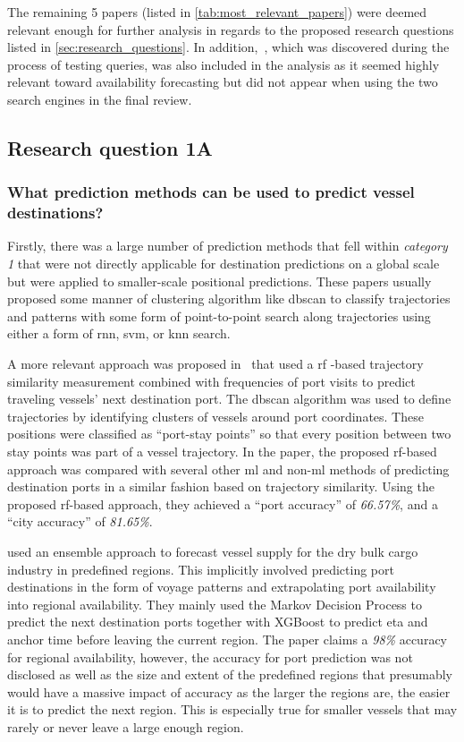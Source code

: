 The remaining \textbf{}5 papers (listed in \cref{tab:most_relevant_papers}) were deemed relevant enough for further analysis in regards to the proposed research questions listed in \cref{sec:research_questions}. In addition,~\cite{lechtenberg2019}, which was discovered during the process of testing queries, was also included in the analysis as it seemed highly relevant toward availability forecasting but did not appear when using the two search engines in the final review.

\subsection{Research question 1A}
\subsubsection{What prediction methods can be used to predict vessel destinations?}

Firstly, there was a large number of prediction methods that fell within \textit{category 1} that were not directly applicable for destination predictions on a global scale but were applied to smaller-scale positional predictions. These papers usually proposed some manner of clustering algorithm like \acrshort{dbscan} to classify trajectories and patterns with some form of point-to-point search along trajectories using either a form of \acrfull{rnn}, \acrfull{svm}, or \acrfull{knn} search.

A more relevant approach was proposed in~\cite{Zhang2020AISApproach} that used a \acrfull{rf} -based trajectory similarity measurement combined with frequencies of port visits to predict traveling vessels' next destination port. The \acrshort{dbscan} algorithm was used to define trajectories by identifying clusters of vessels around port coordinates. These positions were classified as ``port-stay points'' so that every position between two stay points was part of a vessel trajectory. In the paper, the proposed \acrshort{rf}-based approach was compared with several other \acrshort{ml} and non-\acrshort{ml} methods of predicting destination ports in a similar fashion based on trajectory similarity. Using the proposed \acrshort{rf}-based approach, they achieved a ``port accuracy'' of \textit{66.57\%}, and a ``city accuracy'' of \textit{81.65\%}.

\cite{lechtenberg2019} used an ensemble approach to forecast vessel supply for the dry bulk cargo industry in predefined regions. This implicitly involved predicting port destinations in the form of voyage patterns and extrapolating port availability into regional availability. They mainly used the Markov Decision Process to predict the next destination ports together with XGBoost to predict \acrshort{eta} and anchor time before leaving the current region. The paper claims a \textit{98\%} accuracy for regional availability, however, the accuracy for port prediction was not disclosed as well as the size and extent of the predefined regions that presumably would have a massive impact of accuracy as the larger the regions are, the easier it is to predict the next region. This is especially true for smaller vessels that may rarely or never leave a large enough region.

